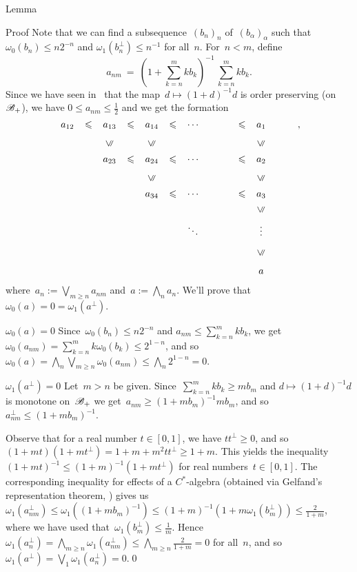 \documentclass[a]{subfiles}
\begin{document}
\begin{parsec}
\begin{point}{Lemma}
\begin{point}{Proof}
Note that we can find a subsequence~$(b_n)_n$ of~$(b_\alpha)_\alpha$
such that $\omega_0( b_n ) 
\leq n2^{-n}$
and $\omega_1(b_n^\perp)\leq n^{-1}$
for all~$n$.
For~$n < m$, define
\begin{equation*}
\textstyle
a_{nm}\ = \ (1+\sum_{k=n}^m kb_k)^{-1} \,\sum_{k=n}^m kb_k.
\end{equation*}
Since we have seen in~
that the map~$d\mapsto (1+d)^{-1}d$ is order preserving
(on~$\mathscr{B}_{+}$),
we have $0\leq a_{nm}\leq \frac{1}{2}$
and we get the formation
\begin{equation*}
\renewcommand{\labelstyle}{\textstyle}
\xymatrix{
a_{12}\ar@{}|-{\leq}[r] & 
a_{13}\ar@{}|-{\leq}[r] & 
a_{14}\ar@{}|-{\leq}[r]  & 
\dotsb & \ar@{}|-{\leq}[r]& a_1 \\
&
a_{23} \ar@{}|-{\leq}[r] \ar@{}[u]|-{\uleq} &
a_{24} \ar@{}|-{\leq}[r]  \ar@{}[u]|-{\uleq} &
\dotsb &\ar@{}|-{\leq}[r]& a_2  \ar@{}[u]|-{\uleq} \\
&
&
a_{34} \ar@{}|-{\leq}[r]  \ar@{}[u]|-{\uleq} & 
\dotsb & \ar@{}|-{\leq}[r] & a_3  \ar@{}[u]|-{\uleq} 
\\
&&&\ddots&&\vdots \ar@{}[u]|-{\uleq}& \\
&&&&&a\ar@{}[u]|-{\uleq}
},
\end{equation*}
where~$a_n:= \bigvee_{m\geq n} a_{nm}$
and~$a := \bigwedge_n a_n$.
We'll prove that~$\omega_0(a)=0=\omega_1(a^\perp)$.
\begin{point}{$\omega_0(a)=0$}%
	Since~$\omega_0(b_n)\leq n2^{-n}$ 
and $a_{nm}\leq \sum_{k=n}^m k b_k$,
we get~$\omega_0(a_{nm})=\sum_{k=n}^m k\omega_0(b_k) \leq 2^{1-n}$,
and so $\omega_0(a)=\bigwedge_n\bigvee_{m\geq n} \omega_0(a_{nm})
\leq \bigwedge_n 2^{1-n} = 0$.
\end{point}
\begin{point}{$\omega_1(a^\perp )=0$}%
Let~$m> n$ be given.
Since~$\sum_{k=n}^m kb_k \geq mb_m$
and $d\mapsto (1+d)^{-1}d$
is monotone on~$\mathscr{B}_{+}$
we get~$a_{nm} \geq (1+mb_m)^{-1} mb_m$,
and so~$a_{nm}^\perp \leq (1+mb_m)^{-1}$.

Observe that for a real number $t\in[0,1]$,
we have $tt^\perp \geq 0$,
and so $(1+mt)(1+mt^\perp) = 1+m+m^2tt^\perp \geq 1+m$.
This yields the inequality $(1+mt)^{-1}\leq (1+m)^{-1}(1+mt^\perp)$
for real numbers~$t\in[0,1]$.
The corresponding inequality for effects of a $C^*$-algebra
(obtained via Gelfand's representation theorem, )
gives us $\omega_1(a_{nm}^\perp)\leq \omega_1((1+mb_m)^{-1})
\leq (1+m)^{-1}(1+m\omega_1(b_m^\perp))\leq \frac{2}{1+m}$,
where we have used that~$\omega_1(b_m^\perp)\leq \frac{1}{m}$.
Hence~$\omega_1(a_n^\perp)=\bigwedge_{m\geq n} \omega_1(a_{nm}^\perp)
\leq \bigwedge_{m\geq n} \frac{2}{1+m}=0$ for all~$n$,
and so~$\omega_1(a^\perp)=\bigvee_1\omega_1(a_n^\perp)=0$.\qed
\end{point}
\end{point}



\end{point}
\end{parsec}
\end{document}
